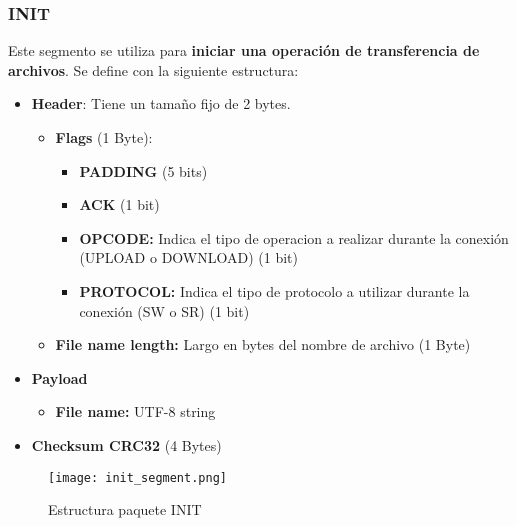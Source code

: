\documentclass[a4paper,10pt]{article}
\begin{document}
\subsubsection{INIT}
Este segmento se utiliza para \textbf{iniciar una operación de transferencia de archivos}. 
Se define con la siguiente estructura:
\begin{itemize}
    \item \textbf{Header}: Tiene un tamaño fijo de 2 bytes.
    \begin{itemize}
        \item \textbf{Flags} (1 Byte):
        \begin{itemize}
        \item \textbf{PADDING} (5 bits)
        \item \textbf{ACK} (1 bit)
        \item \textbf{OPCODE:} Indica el tipo de operacion a realizar durante la conexión (UPLOAD o DOWNLOAD) (1 bit)
        \item \textbf{PROTOCOL:} Indica el tipo de protocolo a utilizar durante la conexión (SW o SR) (1 bit)
        \end{itemize}

        \item \textbf{File name length:} Largo en bytes del nombre de archivo (1 Byte)
    \end{itemize}
    
    \item \textbf{Payload}
    \begin{itemize}
        \item \textbf{File name:} UTF-8 string
    \end{itemize}
    
    \item \textbf{Checksum CRC32} (4 Bytes)
\end{itemize}
\begin{figure}[H]
    \centering
    \texttt{[image: init\_segment.png]}
    \caption{Estructura paquete INIT}
\end{figure}
\end{document}
